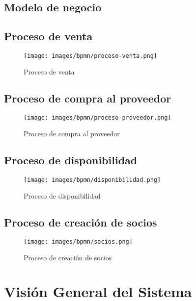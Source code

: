 \begin{landscape}
\section{Modelo de negocio}

\subsection{Proceso de venta}
\begin{figure}[H]
	\texttt{[image: images/bpmn/proceso-venta.png]}
	\caption{Proceso de venta}
\end{figure}
\subsection{Proceso de compra al proveedor}
\begin{figure}[H]
	\texttt{[image: images/bpmn/proceso-proveedor.png]}
	\caption{Proceso de compra al proveedor}
\end{figure}

\subsection{Proceso de disponibilidad}
\begin{figure}[H]
	\texttt{[image: images/bpmn/disponibilidad.png]}
	\caption{Proceso de disponibilidad}
\end{figure}

\subsection{Proceso de creación de socios}
\begin{figure}[H]
	\texttt{[image: images/bpmn/socios.png]}
	\caption{Proceso de creación de socios}
\end{figure}
\end{landscape}

\section{Visión General del Sistema}
